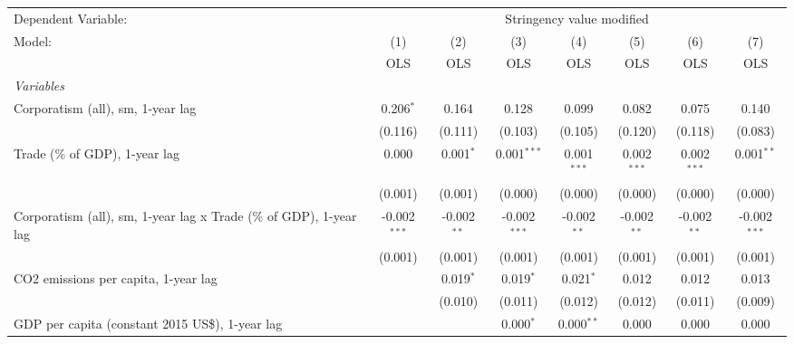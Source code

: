 
\begingroup
\centering
\begin{tabular}{lccccccc}
   \toprule
   Dependent Variable: & \multicolumn{7}{c}{Stringency value modified}\\
   Model:                                                             & (1)            & (2)           & (3)            & (4)           & (5)           & (6)           & (7)\\  
                                                                      &  OLS           & OLS           & OLS            & OLS           & OLS           & OLS           & OLS\\  
   \midrule
   \emph{Variables}\\
   Corporatism (all), sm, 1-year lag                                  & 0.206$^{*}$    & 0.164         & 0.128          & 0.099         & 0.082         & 0.075         & 0.140\\   
                                                                      & (0.116)        & (0.111)       & (0.103)        & (0.105)       & (0.120)       & (0.118)       & (0.083)\\   
   Trade (\% of GDP), 1-year lag                                      & 0.000          & 0.001$^{*}$   & 0.001$^{***}$  & 0.001$^{***}$ & 0.002$^{***}$ & 0.002$^{***}$ & 0.001$^{**}$\\   
                                                                      & (0.001)        & (0.001)       & (0.000)        & (0.000)       & (0.000)       & (0.000)       & (0.000)\\   
   Corporatism (all), sm, 1-year lag x Trade (\% of GDP), 1-year lag  & -0.002$^{***}$ & -0.002$^{**}$ & -0.002$^{***}$ & -0.002$^{**}$ & -0.002$^{**}$ & -0.002$^{**}$ & -0.002$^{***}$\\   
                                                                      & (0.001)        & (0.001)       & (0.001)        & (0.001)       & (0.001)       & (0.001)       & (0.001)\\   
   CO2 emissions per capita, 1-year lag                               &                & 0.019$^{*}$   & 0.019$^{*}$    & 0.021$^{*}$   & 0.012         & 0.012         & 0.013\\   
                                                                      &                & (0.010)       & (0.011)        & (0.012)       & (0.012)       & (0.011)       & (0.009)\\   
   GDP per capita (constant 2015 US\$), 1-year lag                    &                &               & 0.000$^{*}$    & 0.000$^{**}$  & 0.000         & 0.000         & 0.000\\   

\end{tabular}
